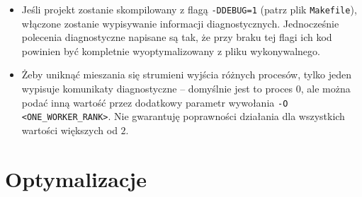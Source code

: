 \documentclass[a4paper,12pt,oneside]{article}
\begin{document}
\begin{itemize}
    \item Jeśli projekt zostanie skompilowany z flagą {\tt -DDEBUG=1} (patrz plik {\tt Makefile}),
        włączone zostanie wypisywanie informacji diagnostycznych. Jednocześnie polecenia diagnostyczne
        napisane są tak, że przy braku tej flagi ich kod powinien być kompletnie wyoptymalizowany z pliku wykonywalnego.
    \item Żeby uniknąć mieszania się strumieni wyjścia różnych procesów, tylko jeden wypisuje
        komunikaty diagnostyczne -- domyślnie jest to proces $0$, ale można podać inną wartość
        przez dodatkowy parametr wywołania {\tt -O <ONE\_WORKER\_RANK>}. Nie gwarantuję poprawności
        działania dla wszystkich wartości większych od $2$.
\end{itemize}

\section{Optymalizacje}
\end{document}
